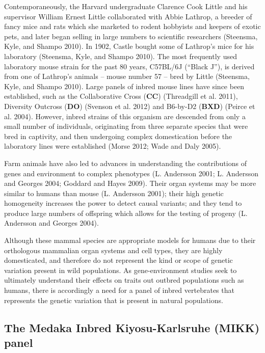 \documentclass[
]{book}
\begin{document}
Contemporaneously, the Harvard undergraduate Clarence Cook Little and his supervisor William Ernest Little collaborated with Abbie Lathrop, a breeder of fancy mice and rats which she marketed to rodent hobbyists and keepers of exotic pets, and later began selling in large numbers to scientific researchers (Steensma, Kyle, and Shampo 2010). In 1902, Castle bought some of Lathrop's mice for his laboratory (Steensma, Kyle, and Shampo 2010). The most frequently used laboratory mouse strain for the past 80 years, C57BL/6J (``Black J''), is derived from one of Lathrop's animals -- mouse number 57 -- bred by Little (Steensma, Kyle, and Shampo 2010). Large panels of inbred mouse lines have since been established, such as the Collaborative Cross (\textbf{CC}) (Threadgill et al. 2011), Diversity Outcross (\textbf{DO}) (Svenson et al. 2012) and B6-by-D2 (\textbf{BXD}) (Peirce et al. 2004). However, inbred strains of this organism are descended from only a small number of individuals, originating from three separate species that were bred in captivity, and then undergoing complex domestication before the laboratory lines were established (Morse 2012; Wade and Daly 2005).

Farm animals have also led to advances in understanding the contributions of genes and environment to complex phenotypes (L. Andersson 2001; L. Andersson and Georges 2004; Goddard and Hayes 2009). Their organ systems may be more similar to humans than mouse (L. Andersson 2001); their high genetic homogeneity increases the power to detect causal variants; and they tend to produce large numbers of offspring which allows for the testing of progeny (L. Andersson and Georges 2004).

Although these mammal species are appropriate models for humans due to their orthologous mammalian organ systems and cell types, they are highly domesticated, and therefore do not represent the kind or scope of genetic variation present in wild populations. As gene-environment studies seek to ultimately understand their effects on traits out outbred populations such as humans, there is accordingly a need for a panel of inbred vertebrates that represents the genetic variation that is present in natural populations.

\hypertarget{MIKK-background}{%
\subsection{The Medaka Inbred Kiyosu-Karlsruhe (MIKK) panel}\label{MIKK-background}}
\end{document}
